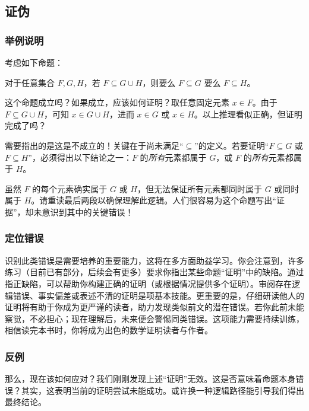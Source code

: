 \subsection{证伪}

\subsubsection*{举例说明}

考虑如下命题：
\begin{center}
    对于任意集合 $F, G, H$，若 $F \subseteq G \cup H$，则要么 $F \subseteq G$ 要么 $F \subseteq H$。
\end{center}

这个命题成立吗？如果成立，应该如何证明？取任意固定元素 $x \in F$。由于 $F \subseteq G \cup H$，可知 $x \in G \cup H$，进而 $x \in G$ 或 $x \in H$。以上推理看似正确，但证明完成了吗？

需要指出的是这是不成立的！关键在于尚未满足``$\subseteq$''的定义。若要证明``$F \subseteq G$ 或 $F \subseteq H$''，必须得出以下结论之一：$F$ 的\emph{所有}元素都属于 $G$，或 $F$ 的\emph{所有}元素都属于 $H$。

虽然 $F$ 的每个元素确实属于 $G$ 或 $H$，但无法保证所有元素都同时属于 $G$ 或同时属于 $H$。请重读最后两段以确保理解此逻辑。人们很容易为这个命题写出``证据''，却未意识到其中的关键错误！

\subsubsection*{定位错误}

识别此类错误是需要培养的重要能力，这将在多方面助益学习。你会注意到，许多练习（目前已有部分，后续会有更多）要求你指出某些命题``证明''中的缺陷。通过指正缺陷，可以帮助你构建正确的证明（或根据情况提供多个证明）。审阅存在逻辑错误、事实偏差或表述不清的证明是项基本技能。更重要的是，仔细研读他人的证明将有助于你成为更严谨的读者，助力发现类似前文的潜在错误。若你此前未能察觉，不必担心；现在理解后，未来便会警惕同类错误。这项能力需要持续训练，相信读完本书时，你将成为出色的数学证明读者与作者。

\subsubsection*{反例}

那么，现在该如何应对？我们刚刚发现上述``证明''无效。这是否意味着命题本身错误？其实，这表明当前的证明尝试未能成功。或许换一种逻辑路径能引导我们得出最终结论。

